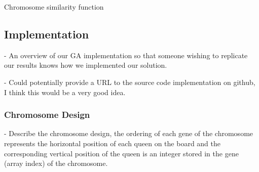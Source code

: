 \documentclass{sig-alternate}
\begin{document}
\begin{algorithm}
  \SetAlgoLined
  \DontPrintSemicolon
  
\caption{Chromosome similarity function}
\end{algorithm}




\subsection{Implementation}

- An overview of our GA implementation so that someone wishing to replicate our 
  results knows how we implemented our solution. 

- Could potentially provide a URL to the source code implementation on github, I think
  this would be a very good idea.


\subsubsection{Chromosome Design}
- Describe the chromosome design, the ordering of each gene of the chromosome represents
  the horizontal position of each queen on the board and the corresponding vertical
  position of the queen is an integer stored in the gene (array index) of the chromosome.
\end{document}
